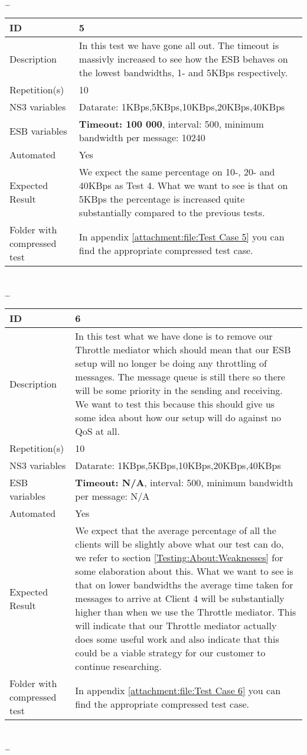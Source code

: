 \begin{center}
\\ \ldots \\

\begin{tabular}{| p{4cm} | p{8cm} |}%
	\hline
	ID & 5 \\
	\hline
	Description & In this test we have gone all out. The timeout is massivly increased to see how the ESB behaves on the lowest bandwidths, 1- and 5KBps respectively.  \\
	\hline
	Repetition(s) & 10 \\
	\hline
	NS3 variables & Datarate: 1KBps,5KBps,10KBps,20KBps,40KBps \\
	\hline
	ESB variables & \textbf{Timeout: 100 000}, interval: 500, minimum bandwidth per message: 10240 \\
	\hline
	Automated & Yes \\
	\hline
	Expected Result & We expect the same percentage on 10-, 20- and 40KBps as Test 4. What we want to see is that on 5KBps the percentage is increased quite substantially compared to the previous tests. \\
	\hline
	Folder with compressed test & In appendix \ref{attachment:file:Test Case 5} you can find the appropriate compressed test case.\\
	\hline
\end{tabular}
\\ \ldots \\
\begin{tabular}{| p{4cm} | p{8cm} |}%
	\hline
	ID & 6 \\
	\hline
	Description & In this test what we have done is to remove our Throttle mediator which should mean that our ESB setup will no longer be doing any throttling of messages. The message queue is still there so there will be some priority in the sending and receiving. We want to test this because this should give us some idea about how our setup will do against no QoS at all. \\
	\hline
	Repetition(s) & 10 \\
	\hline
	NS3 variables & Datarate: 1KBps,5KBps,10KBps,20KBps,40KBps \\
	\hline
	ESB variables & \textbf{Timeout: N/A}, interval: 500, minimum bandwidth per message: N/A \\
	\hline
	Automated & Yes \\
	\hline
	Expected Result & We expect that the average percentage of all the clients will be slightly above what our test can do, we refer to section \ref{Testing:About:Weaknesses} for some elaboration about this. What we want to see is that on lower bandwidths the average time taken for messages to arrive at Client 4 will be substantially higher than when we use the Throttle mediator. This will indicate that our Throttle mediator actually does some useful work and also indicate that this could be a viable strategy for our customer to continue researching. \\
	\hline
	Folder with compressed test & In appendix \ref{attachment:file:Test Case 6} you can find the appropriate compressed test case. \\
	\hline
\end{tabular}

\\ \ldots \\

\end{center}
